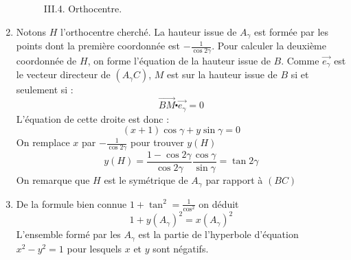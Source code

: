 \begin{enumerate}
\begin{figure}
	\begin{center}
	
	\end{center}
\caption{III.4. Orthocentre.}
\label{fig:Cpseudorec_5}
\end{figure} 

\item Notons $H$ l'orthocentre cherché. La hauteur issue de $A_\gamma$ est formée par les points dont la première coordonnée est $-\frac{1}{\cos 2\gamma}$. Pour calculer la deuxième coordonnée de $H$, on forme l'équation de la hauteur issue de $B$. Comme $\overrightarrow{e_\gamma}$ est le vecteur directeur de $(A_\gamma C)$, $M$ est sur la hauteur issue de $B$ si et seulement si :
\[\overrightarrow{BM}\centerdot \overrightarrow{e_\gamma}=0\]
L'équation de cette droite est donc :
\[(x+1)\cos \gamma + y\sin \gamma =0\]
On remplace $x$ par $-\frac{1}{\cos 2\gamma}$ pour trouver $y(H)$ 
\[y(H)=\frac{1-\cos 2\gamma}{\cos 2\gamma}\frac{\cos \gamma}{\sin \gamma}=\tan 2\gamma\]
On remarque que $H$ est le symétrique de $A_\gamma$ par rapport à $(BC)$
\item De la formule bien connue $1+\tan^2=\frac{1}{\cos^2}$ on déduit
\[1+y(A_\gamma)^2=x(A_\gamma)^2\]
L'ensemble formé par les $A_\gamma$ est la partie de l'hyperbole d'équation $x^2-y^2=1$ pour lesquels $x$ et $y$ sont négatifs.
\end{enumerate}
